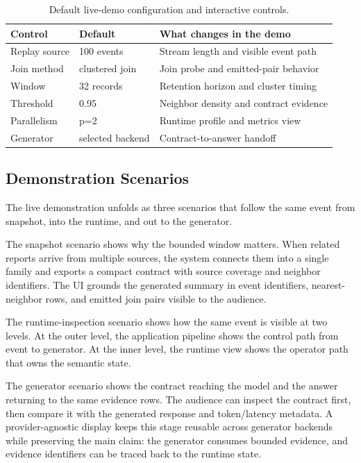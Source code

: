 \documentclass[sigconf]{acmart}
\begin{document}
\begin{table}[t]
  \centering
  \caption{Default live-demo configuration and interactive controls.}
  \label{tab:controls}
  \scriptsize
  \setlength{\tabcolsep}{3pt}
  \begin{tabular}{@{}lll@{}}
    \toprule
    Control & Default & What changes in the demo \\
    \midrule
    Replay source & 100 events & Stream length and visible event path \\
    Join method & clustered join & Join probe and emitted-pair behavior \\
    Window & 32 records & Retention horizon and cluster timing \\
    Threshold & 0.95 & Neighbor density and contract evidence \\
    Parallelism & p=2 & Runtime profile and metrics view \\
    Generator & selected backend & Contract-to-answer handoff \\
    \bottomrule
  \end{tabular}
\end{table}

\subsection{Demonstration Scenarios}

The live demonstration unfolds as three scenarios that follow the same event from snapshot, into the runtime, and out to the generator.

The snapshot scenario shows why the bounded window matters. When related reports arrive from multiple sources, the system connects them into a single family and exports a compact contract with source coverage and neighbor identifiers. The UI grounds the generated summary in event identifiers, nearest-neighbor rows, and emitted join pairs visible to the audience.

The runtime-inspection scenario shows how the same event is visible at two levels. At the outer level, the application pipeline shows the control path from event to generator. At the inner level, the runtime view shows the operator path that owns the semantic state.

The generator scenario shows the contract reaching the model and the answer returning to the same evidence rows. The audience can inspect the contract first, then compare it with the generated response and token/latency metadata. A provider-agnostic display keeps this stage reusable across generator backends while preserving the main claim: the generator consumes bounded evidence, and evidence identifiers can be traced back to the runtime state.
\end{document}
